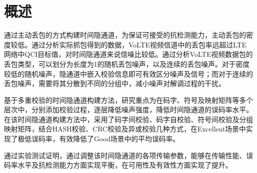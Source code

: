 \section{概述}
\label{chap:hash:overview}

通过主动丢包的方式构建时间隐通道，为保证可接受的抗检测能力，主动丢包的密度较低。通过分析实际抓包得到的数据，VoLTE视频信道中的丢包率远超过LTE网络中QCI目标值，对时间隐通道来说信噪比较低。通过分析VoLTE视频数据包的丢包类型，可以划分为长度为1的随机丢包噪声，以及连续的丢包噪声。对于密度较低的随机噪声，隐通道中嵌入校验信息即可有效区分噪声及信号；而对于连续的丢包噪声，需要将其分散到不同的分组中，减小噪声对解调过程的干扰。

基于多重校验的时间隐通道构建方法，研究重点为在码字、符号及映射矩阵等多个层次中，分别添加校验过程，逐层降低噪声强度，降低时间隐通道的误码率水平。在该时间隐通道构建方法中，采用了码字间校验、码字自校验、符号间校验及分组映射矩阵，结合HASH校验、CRC校验及异或校验几种方式，在Excellent场景中实现了极低误码率，有效降低了Good场景中的平均误码率。

通过实验测试证明，通过调整该时间隐通道的各项传输参数，能够在传输性能、误码率水平及抗检测能力方面实现平衡，在可用性及有效性方面实现了提升。